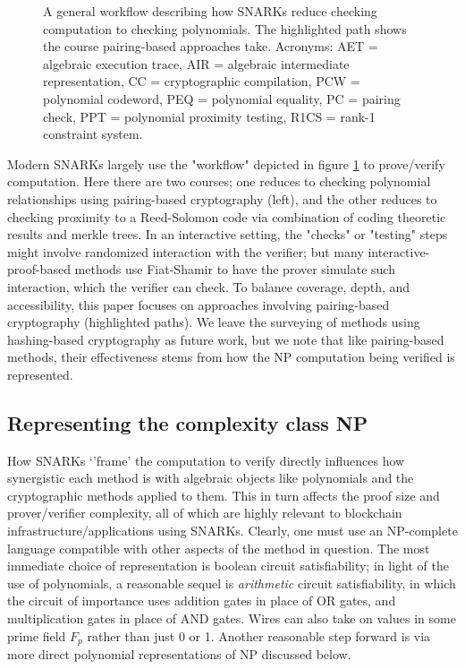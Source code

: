 \begin{figure}[htbp]
    \caption{A general workflow describing how SNARKs reduce checking computation to checking polynomials. The highlighted path shows the course pairing-based approaches take. Acronyms: AET = algebraic execution trace, AIR = algebraic intermediate representation, CC = cryptographic compilation, PCW = polynomial codeword, PEQ = polynomial equality, PC = pairing check, PPT = polynomial proximity testing, R1CS = rank-1 constraint system.}
    \label{fig:snark-workflow}
\end{figure}
\noindent Modern SNARKs largely use the "workflow" depicted in figure \ref{fig:snark-workflow} to prove/verify computation. Here there are two courses; one reduces to checking polynomial relationships using pairing-based cryptography (left), and the other reduces to checking proximity to a Reed-Solomon code via combination of coding theoretic results and merkle trees. In an interactive setting, the "checks" or "testing" steps might involve randomized interaction with the verifier; but many interactive-proof-based methods use Fiat-Shamir to have the prover simulate such interaction, which the verifier can check. To balance coverage, depth, and accessibility, this paper focuses on approaches involving pairing-based cryptography (highlighted paths). We leave the surveying of methods using hashing-based cryptography as future work, but we note that like pairing-based methods, their effectiveness stems from how the NP computation being verified is represented.

\subsection{Representing the complexity class NP}
\noindent How SNARKs `'frame' the computation to verify directly influences how synergistic each method is with algebraic objects like polynomials and the cryptographic methods applied to them. This in turn affects the proof size and prover/verifier complexity, all of which are highly relevant to blockchain infrastructure/applications using SNARKs. Clearly, one must use an NP-complete language compatible with other aspects of the method in question. The most immediate choice of representation is boolean circuit satisfiability; in light of the use of polynomials, a reasonable sequel is \textit{arithmetic} circuit satisfiability, in which the circuit of importance uses addition gates in place of OR gates, and multiplication gates in place of AND gates. Wires can also take on values in some prime field $F_p$  rather than just 0 or 1. Another reasonable step forward is via more direct polynomial representations of NP discussed below.

